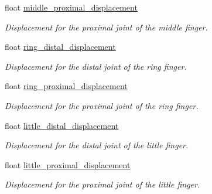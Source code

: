\begin{DoxyCompactItemize}
\mbox{\label{struct_displacement_context_a8a3c74099b4f6364da5f87e0cbf43d03}} 
float \hyperlink{struct_displacement_context_a8a3c74099b4f6364da5f87e0cbf43d03}{middle\+\_\+proximal\+\_\+displacement}
\begin{DoxyCompactList}\small\item\em Displacement for the proximal joint of the middle finger. \end{DoxyCompactList}\item 
\mbox{\label{struct_displacement_context_a89f7742bb18d6af15b403b34650d8172}} 
float \hyperlink{struct_displacement_context_a89f7742bb18d6af15b403b34650d8172}{ring\+\_\+distal\+\_\+displacement}
\begin{DoxyCompactList}\small\item\em Displacement for the distal joint of the ring finger. \end{DoxyCompactList}\item 
\mbox{\label{struct_displacement_context_ac72e95815a8c8f53df07592c75cbdd2d}} 
float \hyperlink{struct_displacement_context_ac72e95815a8c8f53df07592c75cbdd2d}{ring\+\_\+proximal\+\_\+displacement}
\begin{DoxyCompactList}\small\item\em Displacement for the proximal joint of the ring finger. \end{DoxyCompactList}\item 
\mbox{\label{struct_displacement_context_af40ad5638ed743a93f203b2b646e23c5}} 
float \hyperlink{struct_displacement_context_af40ad5638ed743a93f203b2b646e23c5}{little\+\_\+distal\+\_\+displacement}
\begin{DoxyCompactList}\small\item\em Displacement for the distal joint of the little finger. \end{DoxyCompactList}\item 
\mbox{\label{struct_displacement_context_a767fa27546c037a4cd55c47907141933}} 
float \hyperlink{struct_displacement_context_a767fa27546c037a4cd55c47907141933}{little\+\_\+proximal\+\_\+displacement}
\begin{DoxyCompactList}\small\item\em Displacement for the proximal joint of the little finger. \end{DoxyCompactList}\item 

\end{DoxyCompactItemize}
